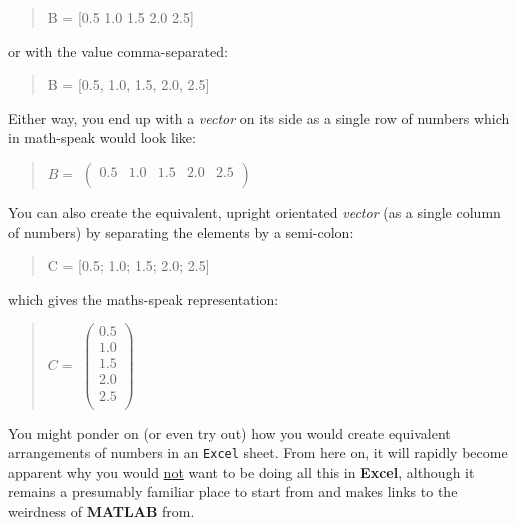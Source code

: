 \documentclass{tufte-book} %
\newenvironment{docspec}{\begin{quotation}\ttfamily\parskip0pt\parindent0pt\ignorespaces}{\end{quotation}}
\begin{document}
\begin{docspec}
B = [0.5 1.0 1.5 2.0 2.5]
\end{docspec}

\noindent or with the value comma-separated:
 
\begin{docspec}
B = [0.5, 1.0, 1.5, 2.0, 2.5]
\end{docspec}

Either way, you end up with a \textit{vector} on its side as a single row of numbers which in math-speak would look like:

\begin{docspec}
\(B=\)
\(\begin{pmatrix}0.5 & 1.0 & 1.5 & 2.0 & 2.5 \\
\end{pmatrix}\)
\end{docspec}

You can also create the equivalent, upright orientated \textit{vector} (as a single column of numbers) by separating the elements by a semi-colon:

\begin{docspec}
C = [0.5; 1.0; 1.5; 2.0; 2.5]
\end{docspec}

\noindent which gives the maths-speak representation:
 
\begin{docspec}
\(C=\)
\(\begin{pmatrix}0.5 \\
1.0 \\
1.5 \\
2.0 \\
2.5 \\
\end{pmatrix}\)
\end{docspec}

You might ponder on (or even try out) how you would create equivalent arrangements of numbers in an \texttt{Excel} sheet. From here on, it will rapidly become apparent why you would \uline{not} want to be doing all this in \textbf{Excel}, although it remains a presumably familiar place to start from and makes links to the weirdness of \textbf{MATLAB} from.
\end{document}
